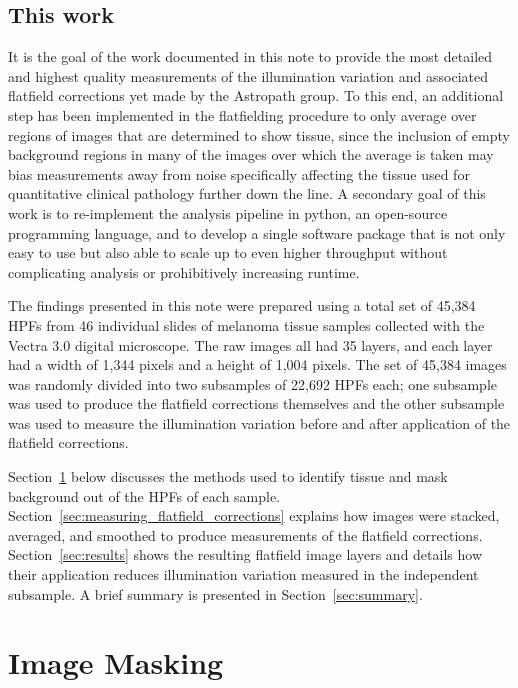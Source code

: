 \documentclass[letterpaper,11pt]{article}
\newcommand{\refsec}[1]{Section~\ref{#1}}
\begin{document}
\subsection{This work}
\label{ssec:this_work}

It is the goal of the work documented in this note to provide the most detailed and highest quality measurements of the illumination variation and associated flatfield corrections yet made by the Astropath group. To this end, an additional step has been implemented in the flatfielding procedure to only average over regions of images that are determined to show tissue, since the inclusion of empty background regions in many of the images over which the average is taken may bias measurements away from noise specifically affecting the tissue used for quantitative clinical pathology further down the line. A secondary goal of this work is to re-implement the analysis pipeline in python, an open-source programming language, and to develop a single software package that is not only easy to use but also able to scale up to even higher throughput without complicating analysis or prohibitively increasing runtime.

The findings presented in this note were prepared using a total set of 45,384 HPFs from 46 individual slides of melanoma tissue samples collected with the Vectra 3.0 digital microscope. The raw images all had 35 layers, and each layer had a width of 1,344 pixels and a height of 1,004 pixels. The set of 45,384 images was randomly divided into two subsamples of 22,692 HPFs each; one subsample was used to produce the flatfield corrections themselves and the other subsample was used to measure the illumination variation before and after application of the flatfield corrections.

\refsec{sec:image_masking} below discusses the methods used to identify tissue and mask background out of the HPFs of each sample. \refsec{sec:measuring_flatfield_corrections} explains how images were stacked, averaged, and smoothed to produce measurements of the flatfield corrections. \refsec{sec:results} shows the resulting flatfield image layers and details how their application reduces illumination variation measured in the independent subsample. A brief summary is presented in \refsec{sec:summary}.

\section{Image Masking}
\label{sec:image_masking}
\end{document}
